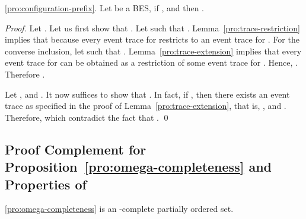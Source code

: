 \documentclass{llncs}
\newcommand{\<}{\langle}
\renewcommand{\>}{\rangle}
\begin{document}
\begin{repproposition}{\ref{pro:configuration-prefix}.}
Let  be a BES, if ,  and  then .
\end{repproposition}

\begin{proof}
Let . Let us first show that . Let  such that  . Lemma~\ref{pro:trace-restriction} implies that  because every event trace for  restricts to an event trace for . For the converse inclusion, let  such that . Lemma~\ref{pro:trace-extension} implies that every event trace for  can be obtained as a restriction of some event trace for . Hence, . Therefore .

Let ,  and . It now suffices to show that . In fact, if , then there exists an event trace  as specified in the proof of Lemma~\ref{pro:trace-extension}, that is, ,  and . Therefore,  which contradict the fact that . \qed
\end{proof}

\subsection{Proof Complement for Proposition~\ref{pro:omega-completeness} and Properties of }

\begin{repproposition}{\ref{pro:omega-completeness}}
 is an -complete partially ordered set.
\end{repproposition}
\end{document}
